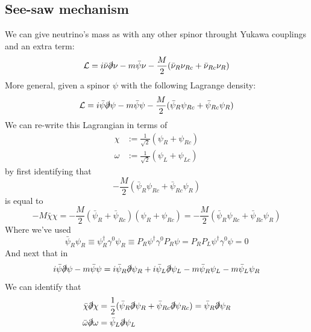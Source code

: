\documentclass[11pt,a4paper,faculty=we,language=en,doctype=report]{cls/ugent-doc}
\begin{document}
\subsection{See-saw mechanism}
We can give neutrino's mass as with any other spinor throught Yukawa couplings and an extra term:
\begin{equation}
	\mathcal{L} = i\bar{\nu}\slashed{\partial}\nu - m\bar{\psi}\nu - \frac{M}{2} (\bar{\nu}_R\nu_{Rc} + \bar{\nu}_{Rc}\nu_R)
\end{equation}
More general, given a spinor $\psi$ with the following Lagrange density:
\begin{equation}
	\mathcal{L} = i\bar{\psi}\slashed{\partial}\psi - m\bar{\psi}\psi - \frac{M}{2} (\bar{\psi}_R\psi_{Rc} + \bar{\psi}_{Rc}\psi_R)
\end{equation}
We can re-write this Lagrangian in terms of
\begin{align}
	\chi &:= \frac{1}{\sqrt{2}} (\psi_R + \psi_{Rc})\\
	\omega &:= \frac{1}{\sqrt{2}} (\psi_L + \psi_{Lc})
\end{align}
by first identifying that
\begin{equation}
	- \frac{M}{2} (\bar{\psi}_R\psi_{Rc} + \bar{\psi}_{Rc}\psi_R)
\end{equation}
is equal to
\begin{equation}
	-M\bar{\chi} \chi = -\frac{M}{2} (\bar{\psi}_R + \bar{\psi}_{Rc}) (\psi_R + \psi_{Rc}) = -\frac{M}{2} (\bar{\psi}_R\psi_{Rc} + \bar{\psi}_{Rc}\psi_R)
\end{equation}
Where we've used
\begin{equation}
	\bar{\psi}_R\psi_{R} \equiv \psi_R^\dagger\gamma^0\psi_{R} \equiv P_R\psi^\dagger\gamma^0P_R\psi = P_RP_L\psi^\dagger\gamma^0\psi = 0
\end{equation}
And next that in
\begin{equation}
	i\bar{\psi}\slashed{\partial}\psi - m\bar{\psi}\psi = i\bar{\psi}_R\slashed{\partial}\psi_{R} + i\bar{\psi}_L\slashed{\partial}\psi_{L} - m\bar{\psi}_R\psi_{L} - m\bar{\psi}_L\psi_{R}
\end{equation}
We can identify that
\begin{align}
	\bar{\chi}\slashed{\partial}\chi &= \frac{1}{2}(\bar{\psi}_R\slashed{\partial}\psi_{R} + \bar{\psi}_{Rc}\slashed{\partial}\psi_{Rc}) = \bar{\psi}_R \slashed{\partial} \psi_{R}\\
	\bar{\omega}\slashed{\partial}\omega &= \bar{\psi}_L \slashed{\partial} \psi_{L}
\end{align}
\end{document}
